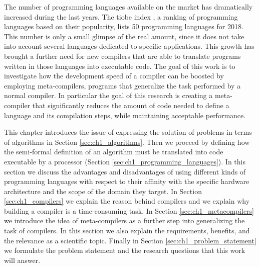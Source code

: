 The number of programming languages available on the market has dramatically increased during the last years. The tiobe index \cite{tiobe2018}, a ranking of programming languages based on their popularity, lists 50 programming languages for 2018. This number is only a small glimpse of the real amount, since it does not take into account several languages dedicated to specific applications. This growth has brought a further need for new compilers that are able to translate programs written in those languages into executable code. The goal of this work is to investigate how the development speed of a compiler can be boosted by employing meta-compilers, programs that generalize the task performed by a normal compiler. In particular the goal of this research is creating a meta-compiler that significantly reduces the amount of code needed to define a language and its compilation steps, while maintaining acceptable performance.

This chapter introduces the issue of expressing the solution of problems in terms of algorithms in Section \ref{sec:ch1_algorithms}. Then we proceed by defining how the semi-formal definition of an algorithm must be translated into code executable by a processor (Section \ref{sec:ch1_programming_languages}). In this section we discuss the advantages and disadvantages of using different kinds of programming languages with respect to their affinity with the specific hardware architecture and the scope of the domain they target. In Section \ref{sec:ch1_compilers} we explain the reason behind compilers and we explain why building a compiler is a time-consuming task. In Section \ref{sec:ch1_metacompilers} we introduce the idea of meta-compilers as a further step into generalizing the task of compilers. In this section we also explain the requirements, benefits, and the relevance as a scientific topic. Finally in Section \ref{sec:ch1_problem_statement} we formulate the problem statement and the research questions that this work will answer.

